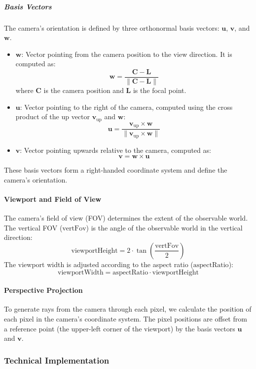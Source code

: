 \documentclass[12pt]{article}
\begin{document}
\subparagraph{Basis Vectors}
The camera's orientation is defined by three orthonormal basis vectors: \(\mathbf{u}\), \(\mathbf{v}\), and \(\mathbf{w}\).
\begin{itemize}
    \item \(\mathbf{w}\): Vector pointing from the camera position to the view direction. It is computed as:
          \[
              \mathbf{w} = \frac{\mathbf{C} - \mathbf{L}}{\|\mathbf{C} - \mathbf{L}\|}
          \]
          where \(\mathbf{C}\) is the camera position and \(\mathbf{L}\) is the focal point.
    \item \(\mathbf{u}\): Vector pointing to the right of the camera, computed using the cross product of the up vector \(\mathbf{v}_{\text{up}}\) and \(\mathbf{w}\):
          \[
              \mathbf{u} = \frac{\mathbf{v}_{\text{up}} \times \mathbf{w}}{\|\mathbf{v}_{\text{up}} \times \mathbf{w}\|}
          \]
    \item \(\mathbf{v}\): Vector pointing upwards relative to the camera, computed as:
          \[
              \mathbf{v} = \mathbf{w} \times \mathbf{u}
          \]
\end{itemize}

These basis vectors form a right-handed coordinate system and define the camera's orientation.

\paragraph{Viewport and Field of View}
The camera's field of view (FOV) determines the extent of the observable world. The vertical FOV (\(\text{vertFov}\)) is the angle of the observable world in the vertical direction:
\[
    \text{viewportHeight} = 2 \cdot \tan\left(\frac{\text{vertFov}}{2}\right)
\]
The viewport width is adjusted according to the aspect ratio (\(\text{aspectRatio}\)):
\[
    \text{viewportWidth} = \text{aspectRatio} \cdot \text{viewportHeight}
\]

\paragraph{Perspective Projection}
To generate rays from the camera through each pixel, we calculate the position of each pixel in the camera's coordinate system. The pixel positions are offset from a reference point (the upper-left corner of the viewport) by the basis vectors \(\mathbf{u}\) and \(\mathbf{v}\).

\subsubsection{Technical Implementation}
\end{document}
